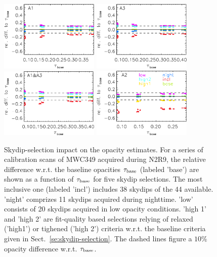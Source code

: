 \begin{figure}[ht!]
  \begin{center}
    \includegraphics[clip=true, trim={0, -0.3cm, -0.3cm, 0},  width=0.42\textwidth]{Figures/Opacity/Skydip_selection_impact_a1.pdf}
    \includegraphics[clip=true, trim={0, -0.3cm, -0.3cm, 0},  width=0.42\textwidth]{Figures/Opacity/Skydip_selection_impact_a3.pdf}
    \includegraphics[clip=true, trim={0, -0.3cm, -0.3cm, 0},  width=0.42\textwidth]{Figures/Opacity/Skydip_selection_impact_1mm.pdf}
    \includegraphics[clip=true, trim={0, -0.3cm, -0.3cm, 0},  width=0.42\textwidth]{Figures/Opacity/Skydip_selection_impact_a2.pdf}
   \caption[Skydip selection impact on opacities]{Skydip-selection
    impact on the opacity estimates. For a series of calibration scans
    of MWC349 acquired during N2R9, the relative difference
    w.r.t. the baseline opacities $\tau_{\rm{base}}$ (labeled 'base')
    are shown as a function of $\tau_{\rm{base}}$ for five skydip
    selections. The most inclusive one (labeled 'incl')
    includes 38 skydips of the 44 available. 'night' comprizes 11
    skydips acquired during nighttime. 'low' consists of 20 skydips
    acquired in low opacity conditions. 'high
    1' and 'high 2' are fit-quality based selections relying of relaxed
    ('high1') or tighened ('high 2') criteria w.r.t. the baseline
    criteria given in Sect.~\ref{se:skydip-selection}. The dashed
    lines figure a $10\%$ opacity difference
    w.r.t. $\tau_{\rm{base}}$.
} 
\label{fig:skydip-selection-impact}
\end{center}
\end{figure}
